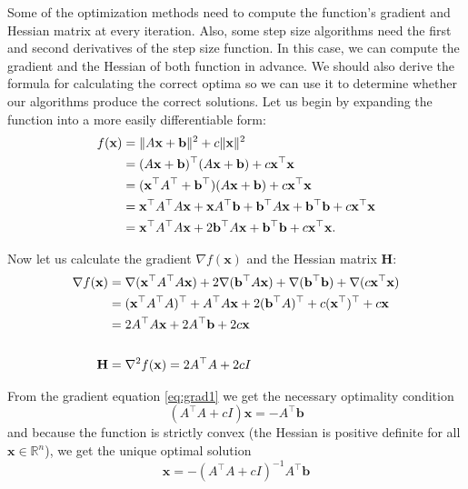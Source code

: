 \documentclass[a4paper,english,titlepage,12pt]{article}
\newcommand{\vect}[1]{\ensuremath{\mathbf{#1}}}
\newcommand{\trans}[1]{\ensuremath\vect{#1}^\top}
\newcommand{\norm}[1]{\ensuremath\Vert #1 \Vert}
\begin{document}
Some of the optimization methods need to compute the function's gradient and Hessian matrix at every iteration. Also, some step size algorithms need the first and second derivatives of the step size function. In this case, we can compute the gradient and the Hessian of both function in advance. 
We should also derive the formula for calculating the correct optima so we can use it to determine whether our algorithms produce the correct solutions. Let us begin by expanding the function into a more easily differentiable form:
\begin{align*}
    f(\vect{x}) &= \norm{A \vect{x} + \vect{b}} ^ 2 + c \norm{\vect{x}} ^ 2 \\
               &= (A \vect{x} + \vect{b})^\top(A \vect{x} + \vect{b}) + c \trans{x} \vect{x} \\
               &= (\trans{x} A^\top + \trans{b})(A\vect{x} + \vect{b}) + c \trans{x} \vect{x} \\
               &= \trans{x} A^\top A \vect{x} + \vect{x} A^\top \vect{b} + \trans{b} A \vect{x} + \trans{b} \vect{b} + c \trans{x} \vect{x} \\
               &= \trans{x} A^\top A \vect{x} + 2 \trans{b} A \vect{x} + \trans{b} \vect{b} + c \trans{x} \vect{x}.
\end{align*}

Now let us calculate the gradient $\nabla f(\vect{x})$ and the Hessian matrix \textbf{H}:
\begin{align}
    \nabla f(\vect{x}) &= \nabla(\trans{x} A^\top A \vect{x}) + 2 \nabla(\trans{b} A \vect{x}) + \nabla(\trans{b} \vect{b}) + \nabla(c \trans{x} \vect{x}) \nonumber \\
    &= (\trans{x} A^\top A)^\top + A^\top A \vect{x} + 2 (\trans{b} A)^\top + c (\trans{x})^\top + c \vect{x} \nonumber \\
    &= 2 A^\top A \vect{x} + 2 A^\top \vect{b} + 2 c \vect{x} \label{eq:grad1}\\
    &\nonumber \\
    \textbf{H} &= \nabla^2 f(\vect{x}) = 2 A^\top A + 2 c I\label{eq:hess1}
\end{align}

From the gradient equation \eqref{eq:grad1} we get the necessary optimality condition
\begin{equation}
    (A^\top A + c I) \vect{x} = - A^\top \vect{b}
\end{equation}
and because the function is strictly convex (the Hessian is positive definite for all $\vect{x} \in \mathbb{R}^n$), we get the unique optimal solution
\begin{equation}
    \vect{x} = - (A^\top A + c I)^{-1} A^\top \vect{b}
\end{equation}
\end{document}
